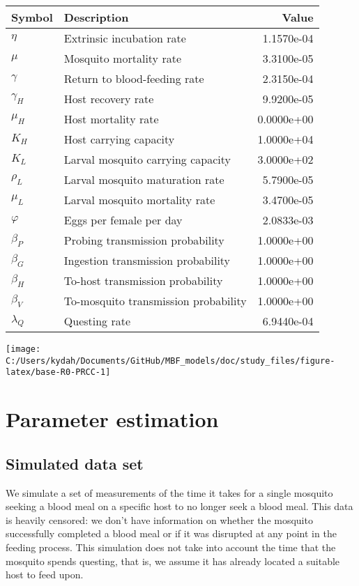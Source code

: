 \documentclass[
]{article}
\begin{document}
\begin{longtable}[]{@{}llr@{}}
\toprule\noalign{}
Symbol & Description & Value \\
\midrule\noalign{}
\endhead
\bottomrule\noalign{}
\endlastfoot
\(\eta\) & Extrinsic incubation rate & 1.1570e-04 \\
\(\mu\) & Mosquito mortality rate & 3.3100e-05 \\
\(\gamma\) & Return to blood-feeding rate & 2.3150e-04 \\
\(\gamma_H\) & Host recovery rate & 9.9200e-05 \\
\(\mu_H\) & Host mortality rate & 0.0000e+00 \\
\(K_H\) & Host carrying capacity & 1.0000e+04 \\
\(K_L\) & Larval mosquito carrying capacity & 3.0000e+02 \\
\(\rho_L\) & Larval mosquito maturation rate & 5.7900e-05 \\
\(\mu_L\) & Larval mosquito mortality rate & 3.4700e-05 \\
\(\varphi\) & Eggs per female per day & 2.0833e-03 \\
\(\beta_P\) & Probing transmission probability & 1.0000e+00 \\
\(\beta_G\) & Ingestion transmission probability & 1.0000e+00 \\
\(\beta_H\) & To-host transmission probability & 1.0000e+00 \\
\(\beta_V\) & To-mosquito transmission probability & 1.0000e+00 \\
\(\lambda_Q\) & Questing rate & 6.9440e-04 \\
\end{longtable}

\texttt{[image: C:/Users/kydah/Documents/GitHub/MBF\_models/doc/study\_files/figure-latex/base-R0-PRCC-1]}

\hypertarget{parameter-estimation}{%
\section{Parameter estimation}\label{parameter-estimation}}

\hypertarget{simulated-data-set}{%
\subsection{Simulated data set}\label{simulated-data-set}}

We simulate a set of measurements of the time it takes for a single
mosquito seeking a blood meal on a specific host to no longer seek a
blood meal. This data is heavily censored: we don't have information on
whether the mosquito successfully completed a blood meal or if it was
disrupted at any point in the feeding process. This simulation does not
take into account the time that the mosquito spends questing, that is,
we assume it has already located a suitable host to feed upon.
\end{document}
